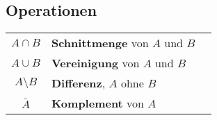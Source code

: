 \subsection{Operationen}

{

	\def\circlea{(0,0) circle (1cm)}
	\def\circleb{(1.5,0cm) circle (1cm)}
	\def\universe{(0,0) circle (1.5cm)}



	\def\vennaandb{\begin{tikzpicture}
			\begin{scope}
				\clip \circlea;
				\fill[filled] \circleb;
			\end{scope}
			\draw[outline] \circlea node {\( A \)};
			\draw[outline] \circleb node {\( B \)};
		\end{tikzpicture}
	}

	\def\vennaorb{
		\begin{tikzpicture}
			\draw[filled] \circlea node {\( A \)}
			\circleb node {\( B \)};
			\draw[outline] \circlea node {\( A \)};
			\draw[outline] \circleb node {\( B \)};
		\end{tikzpicture}
	}

	\def\vennaminusb{
		\begin{tikzpicture}
			\begin{scope}
				\clip \circlea;
				\draw[filled, even odd rule] \circlea node {\( A \)}
				\circleb;
			\end{scope}
			\draw[outline] \circlea node {\( A \)};
			\draw[outline] \circleb node {\( B \)};
		\end{tikzpicture}
	}

	\def\vennnota{
		\begin{tikzpicture}
			\begin{scope}
				\clip \universe;
				\draw[filled, even odd rule, above left] \universe node {} \circlea;
			\end{scope}
			\draw[outline] \circlea node {\( A \)};
		\end{tikzpicture}
	}

	\begin{tabular}{c m{5cm} m{4cm}}
		\( A \cap B \)      & \textbf{Schnittmenge} von \( A \) und \( B \) & \vennaandb   \\
		\( A \cup B \)      & \textbf{Vereinigung} von \( A \) und \( B \)  & \vennaorb    \\
		\( A \setminus B \) & \textbf{Differenz}, \( A \) ohne \( B \)      & \vennaminusb \\
		\(\bar{A}\)         & \textbf{Komplement} von \(A \)                & \vennnota
	\end{tabular}

}
